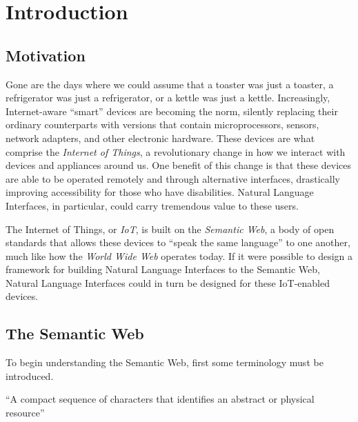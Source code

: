 \documentclass[../main.tex]{subfiles}
\begin{document}
\chapter{Introduction}

\label{chapter:intro}


\section{Motivation}

Gone are the days where we could assume that a toaster was just a toaster, a refrigerator was just a refrigerator, or a kettle was just a kettle.
Increasingly, Internet-aware ``smart'' devices are becoming the norm, silently replacing their ordinary counterparts with versions that contain microprocessors,
sensors, network adapters, and other electronic hardware. These devices are what comprise the {\em Internet of Things}, a revolutionary change in how we interact with devices and appliances around us.  One benefit of this change is that these devices are able to be operated remotely and through alternative interfaces, drastically
improving accessibility for those who have disabilities.  Natural Language Interfaces, in particular, could carry tremendous value to these users.

The Internet of Things, or {\em IoT}, is built on the {\em Semantic Web}, a body of open standards that allows these devices to ``speak the same language'' to one another, much
like how the {\em World Wide Web} operates today\cite{semwebanalogy}.  If it were possible to design a framework for building Natural Language Interfaces to the Semantic Web,
Natural Language Interfaces could in turn be designed for these IoT-enabled devices.



\section{The Semantic Web}

To begin understanding the Semantic Web, first some terminology must be introduced.

\begin{definition}
	``A compact sequence of characters that identifies an abstract or physical resource''\cite{w3curi}
\end{definition}
\end{document}
